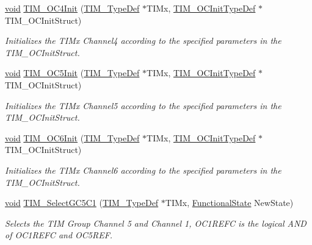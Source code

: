 \begin{DoxyCompactItemize}
\hyperlink{group___n_a_m_e_ga18028b8badbf1ea7e704ccac3c488e82}{void} \hyperlink{group___t_i_m___group2_ga64571ebbb58cac39a9e760050175f11c}{T\-I\-M\-\_\-\-O\-C4\-Init} (\hyperlink{struct_t_i_m___type_def}{T\-I\-M\-\_\-\-Type\-Def} $\ast$T\-I\-Mx, \hyperlink{struct_t_i_m___o_c_init_type_def}{T\-I\-M\-\_\-\-O\-C\-Init\-Type\-Def} $\ast$T\-I\-M\-\_\-\-O\-C\-Init\-Struct)
\begin{DoxyCompactList}\small\item\em Initializes the T\-I\-Mx Channel4 according to the specified parameters in the T\-I\-M\-\_\-\-O\-C\-Init\-Struct. \end{DoxyCompactList}\item 
\hyperlink{group___n_a_m_e_ga18028b8badbf1ea7e704ccac3c488e82}{void} \hyperlink{group___t_i_m___group2_ga6b519aadead936de8068ded1794b6e8f}{T\-I\-M\-\_\-\-O\-C5\-Init} (\hyperlink{struct_t_i_m___type_def}{T\-I\-M\-\_\-\-Type\-Def} $\ast$T\-I\-Mx, \hyperlink{struct_t_i_m___o_c_init_type_def}{T\-I\-M\-\_\-\-O\-C\-Init\-Type\-Def} $\ast$T\-I\-M\-\_\-\-O\-C\-Init\-Struct)
\begin{DoxyCompactList}\small\item\em Initializes the T\-I\-Mx Channel5 according to the specified parameters in the T\-I\-M\-\_\-\-O\-C\-Init\-Struct. \end{DoxyCompactList}\item 
\hyperlink{group___n_a_m_e_ga18028b8badbf1ea7e704ccac3c488e82}{void} \hyperlink{group___t_i_m___group2_ga33cbe12bc14905ab930771a8f806a62c}{T\-I\-M\-\_\-\-O\-C6\-Init} (\hyperlink{struct_t_i_m___type_def}{T\-I\-M\-\_\-\-Type\-Def} $\ast$T\-I\-Mx, \hyperlink{struct_t_i_m___o_c_init_type_def}{T\-I\-M\-\_\-\-O\-C\-Init\-Type\-Def} $\ast$T\-I\-M\-\_\-\-O\-C\-Init\-Struct)
\begin{DoxyCompactList}\small\item\em Initializes the T\-I\-Mx Channel6 according to the specified parameters in the T\-I\-M\-\_\-\-O\-C\-Init\-Struct. \end{DoxyCompactList}\item 
\hyperlink{group___n_a_m_e_ga18028b8badbf1ea7e704ccac3c488e82}{void} \hyperlink{group___t_i_m___group2_gab2855e01878bf42915f9bf686e01ac17}{T\-I\-M\-\_\-\-Select\-G\-C5\-C1} (\hyperlink{struct_t_i_m___type_def}{T\-I\-M\-\_\-\-Type\-Def} $\ast$T\-I\-Mx, \hyperlink{group___exported__types_gac9a7e9a35d2513ec15c3b537aaa4fba1}{Functional\-State} New\-State)
\begin{DoxyCompactList}\small\item\em Selects the T\-I\-M Group Channel 5 and Channel 1, O\-C1\-R\-E\-F\-C is the logical A\-N\-D of O\-C1\-R\-E\-F\-C and O\-C5\-R\-E\-F. \end{DoxyCompactList}\item 

\end{DoxyCompactItemize}
